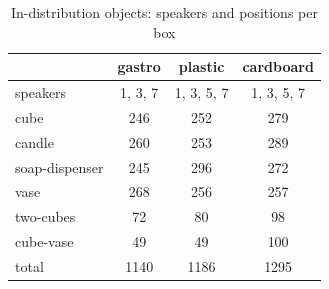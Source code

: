 \begin{table}
\caption{In-distribution objects: speakers and positions per box}
\label{tab:id_objects}
\begin{tabular}{lccc}
\toprule
 & gastro & plastic & cardboard \\
\midrule
speakers & 1, 3, 7 & 1, 3, 5, 7 & 1, 3, 5, 7 \\
cube & 246 & 252 & 279 \\
candle & 260 & 253 & 289 \\
soap-dispenser & 245 & 296 & 272 \\
vase & 268 & 256 & 257 \\
two-cubes & 72 & 80 & 98 \\
cube-vase & 49 & 49 & 100 \\
total & 1140 & 1186 & 1295 \\
\bottomrule
\end{tabular}
\end{table}
